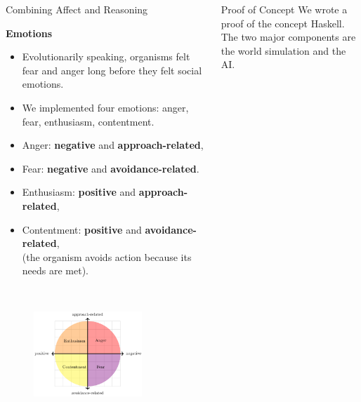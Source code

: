 \documentclass[final,hyperref={pdfpagelabels=false}]{beamer}
\begin{document}
\begin{frame}
\begin{columns}[t]
\begin{column}{.45\textwidth}
\begin{block}{Combining Affect and Reasoning}
                $~$
                
                \textbf{Emotions}
                \begin{itemize}
                	\item Evolutionarily speaking, organisms felt fear and anger long before they felt social emotions.
                	\item We implemented four emotions: anger, fear, enthusiasm, contentment.
                	\item Anger: \textbf{negative} and \textbf{approach-related},
                	\item Fear: \textbf{negative} and \textbf{avoidance-related}.
                	\item Enthusiasm: \textbf{positive} and \textbf{approach-related},
                	\item Contentment: \textbf{positive} and \textbf{avoidance-related},\\ (the organism avoids action because its needs are met).
                \end{itemize}
                
                $~$
                
                \begin{figure}
                	\centering
                	\includegraphics[width=0.75\textwidth]{figures/psbc.png}
                \end{figure}
            \end{block}
        \end{column}
        
        \begin{column}{.45\textwidth}            
            \begin{block}{Proof of Concept}
            	We wrote a proof of the concept Haskell. The two major components are the world simulation and the AI.
                

\end{block}
\end{column}
\end{columns}
\end{frame}
\end{document}
